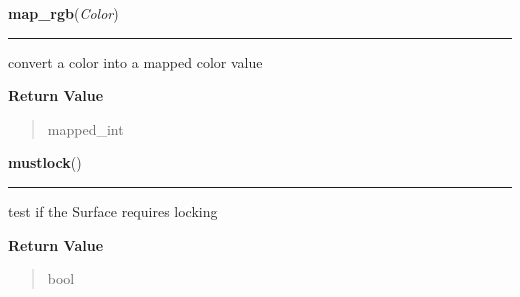 \hspace{.8\funcindent}\begin{boxedminipage}{\funcwidth}

    \raggedright \textbf{map\_rgb}(\textit{Color})

    \vspace{-1.5ex}

    \rule{\textwidth}{0.5\fboxrule}
\setlength{\parskip}{2ex}
    convert a color into a mapped color value

\setlength{\parskip}{1ex}
      \textbf{Return Value}
    \vspace{-1ex}

      \begin{quote}
      mapped\_int

      \end{quote}

    \end{boxedminipage}

    \label{pygame:Surface:mustlock}

    \vspace{0.5ex}

\hspace{.8\funcindent}\begin{boxedminipage}{\funcwidth}

    \raggedright \textbf{mustlock}()

    \vspace{-1.5ex}

    \rule{\textwidth}{0.5\fboxrule}
\setlength{\parskip}{2ex}
    test if the Surface requires locking

\setlength{\parskip}{1ex}
      \textbf{Return Value}
    \vspace{-1ex}

      \begin{quote}
      bool

      \end{quote}

    \end{boxedminipage}

    \label{pygame:Surface:scroll}

    \vspace{0.5ex}

